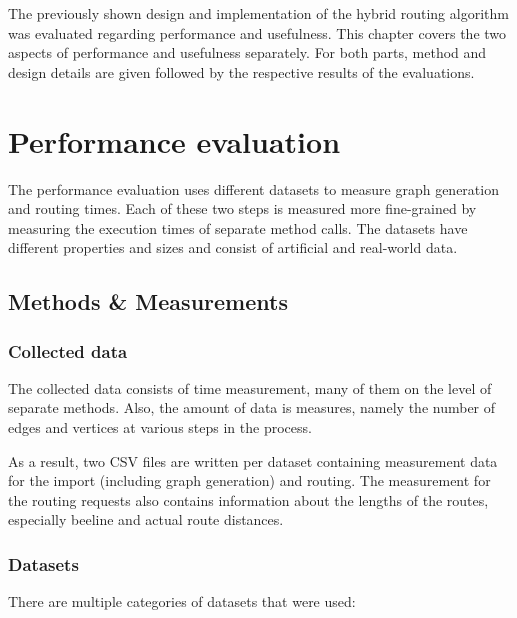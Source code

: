 
The previously shown design and implementation of the hybrid routing algorithm was evaluated regarding performance and usefulness.
This chapter covers the two aspects of performance and usefulness separately.
For both parts, method and design details are given followed by the respective results of the evaluations.

\section{Performance evaluation}

	The performance evaluation uses different datasets to measure graph generation and routing times.
	Each of these two steps is measured more fine-grained by measuring the execution times of separate method calls.
	The datasets have different properties and sizes and consist of artificial and real-world data.

	\subsection{Methods \& Measurements}

		\subsubsection{Collected data}
		
			The collected data consists of time measurement, many of them on the level of separate methods.
			Also, the amount of data is measures, namely the number of edges and vertices at various steps in the process.
			
			As a result, two CSV files are written per dataset containing measurement data for the import (including graph generation) and routing.
			The measurement for the routing requests also contains information about the lengths of the routes, especially beeline and actual route distances.
			
		
		\subsubsection{Datasets}
		
			There are multiple categories of datasets that were used:
			
